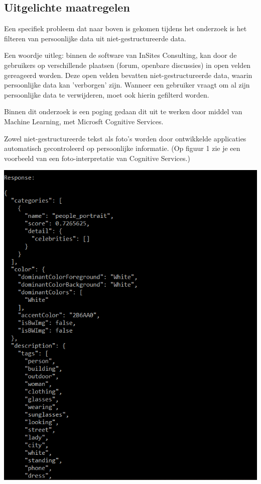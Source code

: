 \documentclass[a0,portrait]{a0poster}
\begin{document}
\begin{multicols}{2}
\color{HoGentAccent1} 
\section*{Uitgelichte maatregelen}
\color{black}
Een specifiek probleem dat naar boven is gekomen tijdens het onderzoek is het filteren van persoonlijke data uit niet-gestructureerde data.

Een woordje uitleg: binnen de software van InSites Consulting, kan door de gebruikers op verschillende plaatsen (forum, openbare discussies) in open velden gereageerd worden. Deze open velden bevatten niet-gestructureerde data, waarin persoonlijke data kan 'verborgen' zijn. 
Wanneer een gebruiker vraagt om al zijn persoonlijke data te verwijderen, moet ook hierin gefilterd worden. 

Binnen dit onderzoek is een poging gedaan dit uit te werken door middel van Machine Learning, met Microsft Cognitive Services. 

Zowel niet-gestructureerde tekst als foto's worden door ontwikkelde applicaties automatisch gecontroleerd op persoonlijke informatie. (Op figuur 1 zie je een voorbeeld van een foto-interpretatie van Cognitive Services.)

\begin{center}\vspace{1cm}
\includegraphics[width=1.0\linewidth]{JSONPICTURE}
\end{center}\vspace{1cm}


\end{multicols}
\end{document}
